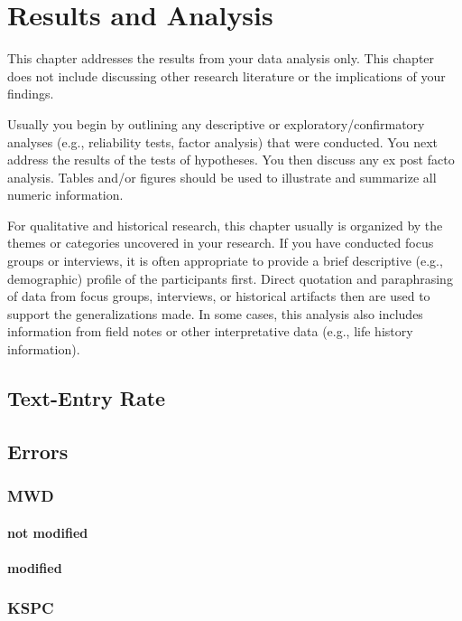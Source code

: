 \chapter{Results and Analysis}

 This chapter addresses the results from your data analysis only. This chapter does not include discussing
other research literature or the implications of your findings.

 Usually you begin by outlining any descriptive or exploratory/confirmatory analyses (e.g., reliability tests,
factor analysis) that were conducted. You next address the results of the tests of hypotheses. You then discuss any
ex post facto analysis. Tables and/or figures should be used to illustrate and summarize all numeric information.

 For qualitative and historical research, this chapter usually is organized by the themes or categories
uncovered in your research. If you have conducted focus groups or interviews, it is often appropriate to provide a
brief descriptive (e.g., demographic) profile of the participants first. Direct quotation and paraphrasing of data from
focus groups, interviews, or historical artifacts then are used to support the generalizations made. In some cases,
this analysis also includes information from field notes or other interpretative data (e.g., life history information).

\section{Text-Entry Rate}

\section{Errors}

\subsection{MWD}

\subsubsection{not modified}

\subsubsection{modified}

\subsection{KSPC}

